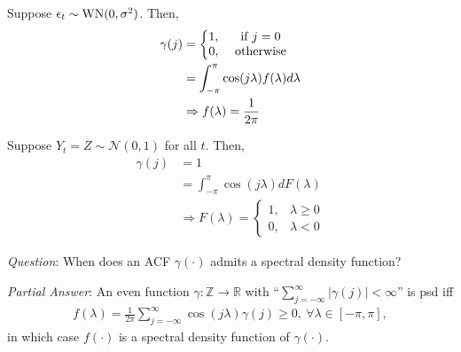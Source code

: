 \documentclass[11pt]{elegantbook}
\begin{document}
\begin{example}
    Suppose $\epsilon_t\sim \textnormal{WN}(0,\sigma^2)$. Then,
    \begin{equation}
        \begin{aligned}
            \gamma(j)&=\left\{\begin{matrix}
                1,&\textnormal{ if }j=0\\
                0,&\textnormal{ otherwise}
            \end{matrix}\right.\\
            &=\int_{-\pi}^\pi \cos(j\lambda)f(\lambda) d \lambda\\
            &\Rightarrow f(\lambda)=\frac{1}{2\pi}
        \end{aligned}
        \nonumber
    \end{equation}
\end{example}

\begin{example}
    Suppose $Y_t=Z\sim \mathcal{N}(0,1)$ for all $t$. Then,
    \begin{equation}
        \begin{aligned}
            \gamma(j)&=1\\
            &=\int_{-\pi}^\pi \cos(j\lambda) d F(\lambda)\\
            & \Rightarrow F(\lambda)=
            \left\{\begin{matrix}
                1,&\lambda\geq 0\\
                0,&\lambda<0
            \end{matrix}\right.
        \end{aligned}
        \nonumber
    \end{equation}
\end{example}

\textit{Question}: When does an ACF $\gamma(\cdot)$ admits a spectral density function?

\textit{Partial Answer}: An even function $\gamma: \mathbb{Z}\rightarrow \mathbb{R}$ with ``$\sum_{j=-\infty}^\infty |\gamma(j)|<\infty$'' is psd iff
\begin{equation}
    \begin{aligned}
        f(\lambda)=\frac{1}{2\pi}\sum_{j=-\infty}^\infty \cos\left(j\lambda\right)\gamma(j)\geq 0,\ \forall \lambda\in[-\pi, \pi],
    \end{aligned}
    \label{eq:partial_answer}
\end{equation}
in which case $f(\cdot)$ is a spectral density function of $\gamma(\cdot)$.
\end{document}
